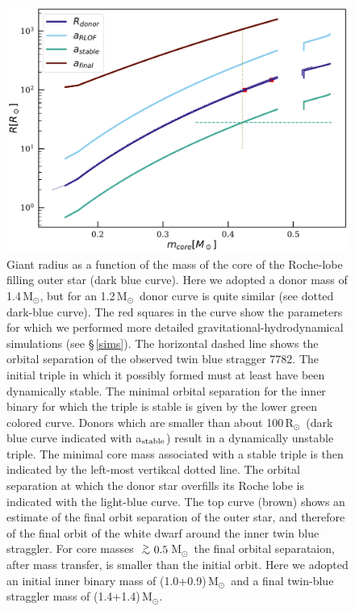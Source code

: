 \documentclass{aastex62}
\newcommand{\MSun}{\mbox{M$_\odot$}}
\newcommand{\RSun}{\mbox{R$_\odot$}}
\def\apgt{\ {\raise-.5ex\hbox{$\buildrel>\over\sim$}}\ }
\begin{document}
\begin{figure}[ht!]
  \includegraphics[width=\columnwidth]{fig_M14MSun_outerorbit.pdf}
  \caption{Giant radius as a function of the mass of the core of the
    Roche-lobe filling outer star (dark blue curve).  Here we adopted
    a donor mass of 1.4\,\MSun, but for an 1.2\,\MSun\, donor curve is
    quite similar (see dotted dark-blue curve).  The red squares in
    the curve show the parameters for which we performed more detailed
    gravitational-hydrodynamical simulations (see \S\,\ref{sims}).
    The horizontal dashed line shows the orbital separation of the
    observed twin blue stragger 7782.  The initial triple in which it
    possibly formed must at least have been dynamically stable. The
    minimal orbital separation for the inner binary for which the
    triple is stable is given by the lower green colored curve.
    Donors which are smaller than about 100\,\RSun\, (dark blue curve
    indicated with a$_{\rm stable}$) result in a dynamically unstable
    triple. The minimal core mass associated with a stable triple is
    then indicated by the left-most vertikcal dotted line.  The
    orbital separation at which the donor star overfills its Roche
    lobe is indicated with the light-blue curve. The top curve (brown)
    shows an estimate of the final orbit separation of the outer star,
    and therefore of the final orbit of the white dwarf around the
    inner twin blue straggler.  For core masses $\apgt 0.5$\,\MSun\,
    the final orbital separataion, after mass transfer, is smaller
    than the initial orbit.  Here we adopted an initial inner binary
    mass of (1.0+0.9)\,\MSun\, and a final twin-blue straggler mass of
    (1.4+1.4)\,\MSun.
\label{fig:tertiarymass_vs_size}}
\end{figure}
\end{document}
